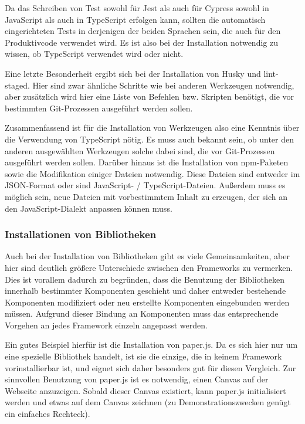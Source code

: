 Da das Schreiben von Test sowohl für Jest als auch für Cypress sowohl in JavaScript als auch in TypeScript erfolgen kann, sollten die automatisch eingerichteten Tests in derjenigen der beiden Sprachen sein, die auch für den Produktivcode verwendet wird. Es ist also bei der Installation notwendig zu wissen, ob TypeScript verwendet wird oder nicht.

Eine letzte Besonderheit ergibt sich bei der Installation von Husky und lint-staged. Hier sind zwar ähnliche Schritte wie bei anderen Werkzeugen notwendig, aber zusätzlich wird hier eine Liste von Befehlen bzw. Skripten benötigt, die vor bestimmten Git-Prozessen ausgeführt werden sollen.

Zusammenfassend ist für die Installation von Werkzeugen also eine Kenntnis über die Verwendung von TypeScript nötig. Es muss auch bekannt sein, ob unter den anderen ausgewählten Werkzeugen solche dabei sind, die vor Git-Prozessen ausgeführt werden sollen. Darüber hinaus ist die Installation von \gls{npm}-Paketen sowie die Modifikation einiger Dateien notwendig. Diese Dateien sind entweder im \gls{JSON}-Format oder sind JavaScript- / TypeScript-Dateien. Außerdem muss es möglich sein, neue Dateien mit vorbestimmtem Inhalt zu erzeugen, der sich an den JavaScript-Dialekt anpassen können muss.

\subsubsection{Installationen von Bibliotheken}
Auch bei der Installation von Bibliotheken gibt es viele Gemeinsamkeiten, aber hier sind deutlich größere Unterschiede zwischen den Frameworks zu vermerken. Dies ist vorallem dadurch zu begründen, dass die Benutzung der Bibliotheken innerhalb bestimmter Komponenten geschieht und daher entweder bestehende Komponenten modifiziert oder neu erstellte Komponenten eingebunden werden müssen. Aufgrund dieser Bindung an Komponenten muss das entsprechende Vorgehen an jedes Framework einzeln angepasst werden.

Ein gutes Beispiel hierfür ist die Installation von paper.js. Da es sich hier nur um eine spezielle Bibliothek handelt, ist sie die einzige, die in keinem Framework vorinstallierbar ist, und eignet sich daher besonders gut für diesen Vergleich. Zur sinnvollen Benutzung von paper.js ist es notwendig, einen Canvas auf der Webseite anzuzeigen. Sobald dieser Canvas existiert, kann paper.js initialisiert werden und etwas auf dem Canvas zeichnen (zu Demonstrationszwecken genügt ein einfaches Rechteck).

